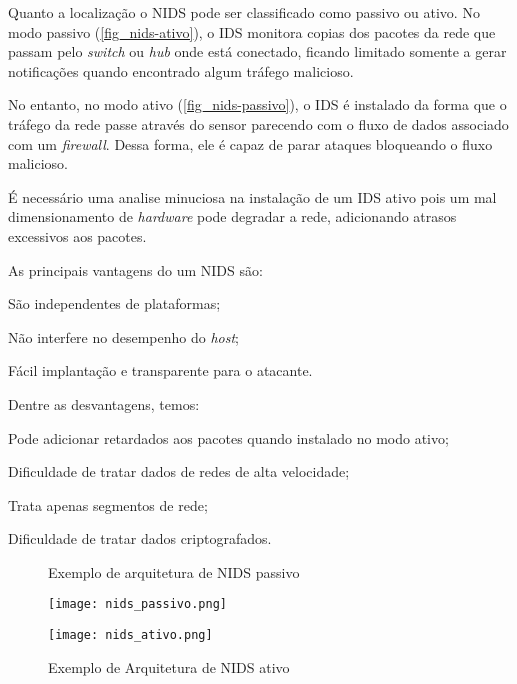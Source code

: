 Quanto a localização o NIDS pode ser classificado como passivo ou ativo. No modo passivo (\autoref{fig_nids-ativo}), o IDS monitora copias dos pacotes da rede que passam pelo \textit{switch} ou \textit{hub} onde está conectado, ficando limitado somente a gerar notificações quando encontrado algum tráfego malicioso. 

No entanto, no modo ativo (\autoref{fig_nids-passivo}), o IDS é instalado da forma que o tráfego da rede passe através do sensor parecendo com o fluxo de dados associado com um \textit{firewall}. Dessa forma, ele é capaz de parar ataques bloqueando o fluxo malicioso. 

É necessário uma analise minuciosa na instalação de um IDS ativo pois um mal dimensionamento de \textit{hardware} pode degradar a rede, adicionando atrasos excessivos aos pacotes.

As principais vantagens do um NIDS são: 

\begin{alineas}
\item São independentes de plataformas;
\item Não interfere no desempenho do \textit{host};
\item Fácil implantação e transparente para o atacante.
\end{alineas}

Dentre as desvantagens, temos:

\begin{alineas}
\item Pode adicionar retardados aos pacotes quando instalado no modo ativo;
\item Dificuldade de tratar dados de redes de alta velocidade;
\item Trata apenas segmentos de rede;
\item Dificuldade de tratar dados criptografados.
\end{alineas}


\begin{figure}[htb]
 \label{fig_nids-arquitetura}
 \centering
 \begin{minipage}{0.4\textwidth}
  \centering
  \caption{Exemplo de arquitetura de NIDS passivo} \label{fig_nids-passivo}
  \texttt{[image: nids\_passivo.png]}
 \end{minipage}
 \hfill
 \begin{minipage}{0.4\textwidth}
  \centering
  \caption{Exemplo de Arquitetura de NIDS ativo} \label{fig_nids-ativo}
  \texttt{[image: nids\_ativo.png]}
 \end{minipage}
\end{figure}

